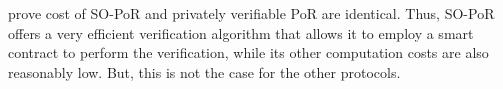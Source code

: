 prove cost of SO-PoR and privately verifiable PoR \cite{DBLP:conf/asiacrypt/ShachamW08} are identical. Thus, SO-PoR offers a very efficient verification algorithm that allows it to employ a smart contract to perform the verification, while its other computation costs are also reasonably low. But, this is not the case for the other protocols. 







